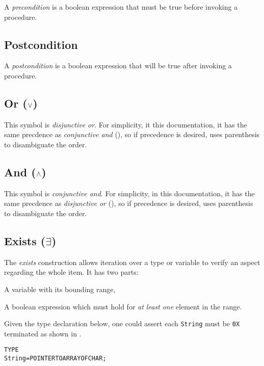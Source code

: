 A \emph{precondition} is a boolean expression that must be true before
invoking a procedure.


\subsection{Postcondition}

A \emph{postcondition} is a boolean expression that will be true
after invoking a procedure.

\subsection{Or ($\vee$)}\label{intro:or}

This symbol is \emph{disjunctive or}.  For simplicity, it this
documentation, it has the same precdence as \emph{conjunctive and}
(), so if precedence is desired, uses parenthesis to
disambiguate the order.

\subsection{And ($\wedge$)}\label{intro:and}

This symbol is \emph{conjunctive and}.  For simplicity, in this
documentation, it has the same precdence as \emph{disjunctive or}
(), so if precedence is desired, uses parenthesis to
disambiguate the order.

\subsection{Exists ($\exists$)}

The \emph{exists} construction allows iteration over a type or
variable to verify an aspect regarding the whole item.  It has two
parts:
\begin{enumerate*}[label=\arabic*)]
\item A variable with its bounding range,
\item A boolean expression which must hold for \emph{at least one}
  element in the range.
\end{enumerate*}  Given the type declaration below, one could assert
each \texttt{String} must be \texttt{0X} terminated as shown in
.

\begin{alltt}
  TYPE
    String = POINTER TO ARRAY OF CHAR;
\end{alltt}

